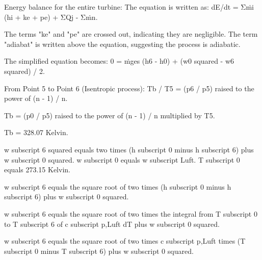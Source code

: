 Energy balance for the entire turbine:  
The equation is written as:  
dE/dt = Σṁi (hi + ke + pe) + ΣQj - Σṁn.  

The terms "ke" and "pe" are crossed out, indicating they are negligible. The term "adiabat" is written above the equation, suggesting the process is adiabatic.  

The simplified equation becomes:  
0 = ṁges (h6 - h0) + (w0 squared - w6 squared) / 2.  

From Point 5 to Point 6 (Isentropic process):  
Tb / T5 = (p6 / p5) raised to the power of (n - 1) / n.  

Tb = (p0 / p5) raised to the power of (n - 1) / n multiplied by T5.  

Tb = 328.07 Kelvin.

w subscript 6 squared equals two times (h subscript 0 minus h subscript 6) plus w subscript 0 squared.  
w subscript 0 equals w subscript Luft.  
T subscript 0 equals 273.15 Kelvin.  

w subscript 6 equals the square root of two times (h subscript 0 minus h subscript 6) plus w subscript 0 squared.  

w subscript 6 equals the square root of two times the integral from T subscript 0 to T subscript 6 of c subscript p,Luft dT plus w subscript 0 squared.  

w subscript 6 equals the square root of two times c subscript p,Luft times (T subscript 0 minus T subscript 6) plus w subscript 0 squared.